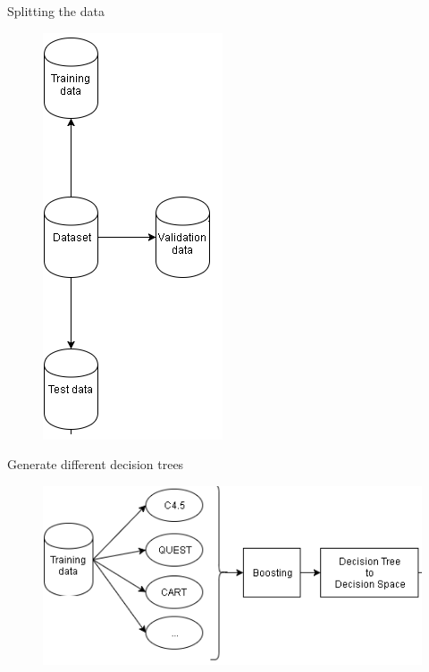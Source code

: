 \documentclass[english]{beamer}
\begin{document}
\begin{frame}{Splitting the data}
	\vspace{-1em}
	\begin{figure}
		\centering
		\includegraphics[scale=0.5]{figures/split_data.png}
	\end{figure}	
\end{frame}

\begin{frame}{Generate different decision trees}
	\vspace{-2em}
	\begin{figure}
		\centering
		\includegraphics[scale=0.8]{figures/generate_dt.png}
	\end{figure}	
\end{frame}
\end{document}
